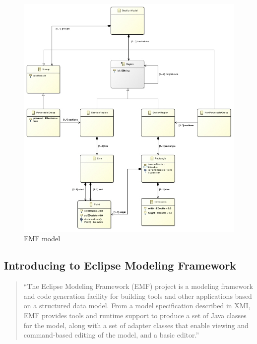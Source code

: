\begin{figure}[p]
	\centering
	\includegraphics[width=\linewidth]{include/figures/chapter_6/sectionmodel}
	\caption{EMF model} 
	\label{fig:case_study:model}
\end{figure}

\subsection{Introducing to Eclipse Modeling Framework}
\begin{quotation}
	``The Eclipse Modeling Framework (EMF) project is a modeling framework and code generation facility for building tools and other applications based on a structured data model. From a model specification described in XMI, EMF provides tools and runtime support to produce a set of Java classes for the model, along with a set of adapter classes that enable viewing and command-based editing of the model, and a basic editor.'' \cite{EMF}
\end{quotation}

